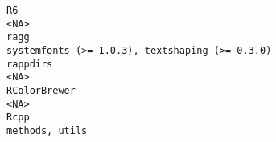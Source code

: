 \documentclass[
  letterpaper,
  DIV=11,
  numbers=noendperiod]{scrreprt}
\begin{document}
\begin{verbatim}
R6                                                                                                                                                                                                                                                                                                                                                                                                                                                                                                                                                                                                                    <NA>
ragg                                                                                                                                                                                                                                                                                                                                                                                                                                                                                                                                                                        systemfonts (>= 1.0.3), textshaping (>= 0.3.0)
rappdirs                                                                                                                                                                                                                                                                                                                                                                                                                                                                                                                                                                                                              <NA>
RColorBrewer                                                                                                                                                                                                                                                                                                                                                                                                                                                                                                                                                                                                          <NA>
Rcpp                                                                                                                                                                                                                                                                                                                                                                                                                                                                                                                                                                                                        methods, utils

\end{verbatim}
\end{document}
